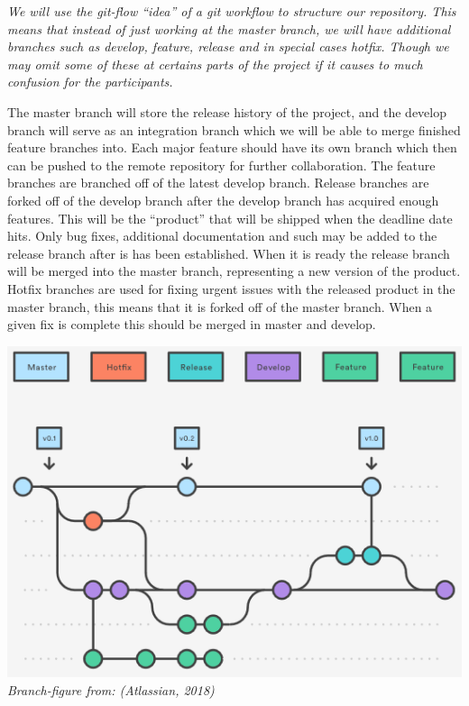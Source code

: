 \documentclass[12pt]{article}%
\begin{document}
\textit{We will use the git-flow “idea” of a git workflow to structure our repository. This means that instead of just working at the master branch, we will have additional branches such as develop, feature, release and in special cases hotfix. Though we may omit some of these at certains parts of the project if it causes to much confusion for the participants.}
\vspace{5mm} %

The master branch will store the release history of the project, and the develop 		branch will serve as an integration branch which we will be able to merge finished 	feature branches into. Each major feature should have its own branch which then can be pushed to the remote repository for further collaboration. The feature branches are branched off of the latest develop branch.
\vspace{5mm} %
    Release branches are forked off of the develop branch after the develop branch has acquired enough features. This will be the “product” that will be shipped when the deadline date hits. Only bug fixes, additional documentation and such may be added to the release branch after is has been established. When it is ready the release branch will be merged into the master branch, representing a new version of the product.
Hotfix branches are used for fixing urgent issues with the released product in the master branch, this means that it is forked off of the master branch. When a given fix is complete this should be merged in master and develop.

\vspace{5mm}
\begin{center}
\includegraphics[scale=0.8]{image12.png}\\
\textit{Branch-figure from: (Atlassian, 2018)}
\end{center}
\vspace{5mm}
\end{document}
